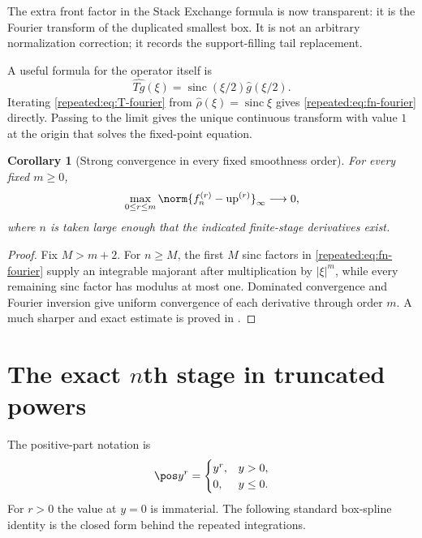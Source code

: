 \documentclass[11pt,oneside]{article}
\newtheorem{corollary}[theorem]{Corollary}
\theoremstyle{definition}
\theoremstyle{remark}
\newcommand{\Up}{\operatorname{up}}
\newcommand{\sinc}{\operatorname{sinc}}
\begin{document}
The extra front factor in the Stack Exchange formula is now transparent: it is the Fourier
transform of the duplicated smallest box.  It is not an arbitrary normalization correction;
it records the support-filling tail replacement.

A useful formula for the operator itself is
\begin{equation}
 \widehat{Tg}(\xi)=\sinc(\xi/2)\widehat g(\xi/2).           \label{repeated:eq:T-fourier}
\end{equation}
Iterating \eqref{repeated:eq:T-fourier} from $\widehat\rho(\xi)=\sinc\xi$ gives
\eqref{repeated:eq:fn-fourier} directly.  Passing to the limit gives the unique continuous transform
with value $1$ at the origin that solves the fixed-point equation.

\begin{corollary}[Strong convergence in every fixed smoothness order]
\label{repeated:cor:Cm-convergence}
For every fixed $m\ge0$,
\begin{equation}
 \max_{0\le r\le m}\norm{f_n^{(r)}-\Up^{(r)}}_\infty\longrightarrow0,        \label{repeated:eq:Cm-convergence}
\end{equation}
where $n$ is taken large enough that the indicated finite-stage derivatives exist.
\end{corollary}

\begin{proof}
Fix $M>m+2$.  For $n\ge M$, the first $M$ sinc factors in \eqref{repeated:eq:fn-fourier} supply an
integrable majorant after multiplication by $|\xi|^m$, while every remaining sinc factor has
modulus at most one.  Dominated convergence and Fourier inversion give uniform convergence of
each derivative through order $m$.  A much sharper and exact estimate is proved in
.
\end{proof}

\section{The exact \texorpdfstring{$n$th}{n-th} stage in truncated powers}
\label{repeated:sec:closed-form}

The positive-part notation is
\[
 \pos y^r=\begin{cases}y^r,&y>0,\\0,&y\le0.\end{cases}
\]
For $r>0$ the value at $y=0$ is immaterial.  The following standard box-spline identity is the
closed form behind the repeated integrations.
\end{document}
